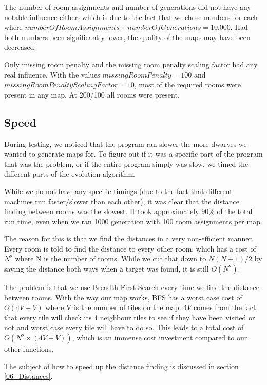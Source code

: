 The number of room assignments and number of generations did not have any notable influence either, which is due to the fact that we chose numbers for each where $numberOfRoomAssignments \times numberOfGenerations = 10.000$. Had both numbers been significantly lower, the quality of the maps may have been decreased.

Only missing room penalty and the missing room penalty scaling factor had any real influence. With the values $missingRoomPenalty = 100$ and $missingRoomPenaltyScalingFactor = 10$, most of the required rooms were present in any map. At 200/100 all rooms were present.

\subsection{Speed}

During testing, we noticed that the program ran slower the more dwarves we wanted to generate maps for. To figure out if it was a specific part of the program that was the problem, or if the entire program simply was slow, we timed the different parts of the evolution algorithm.

While we do not have any specific timings (due to the fact that different machines run faster/slower than each other), it was clear that the distance finding between rooms was the slowest. It took approximately 90\% of the total run time, even when we ran 1000 generation with 100 room assignments per map.

The reason for this is that we find the distances in a very non-efficient manner. Every room is told to find the distance to every other room, which has a cost of $N^2$ where N is the number of rooms. While we cut that down to $N(N+1)/2$ by saving the distance both ways when a target was found, it is still $O(N^2)$.

The problem is that we use Breadth-First Search every time we find the distance between rooms. With the way our map works, BFS has a worst case cost of $O(4V + V)$ where V is the number of tiles on the map. $4V$ comes from the fact that every tile will check its 4 neighbour tiles to see if they have been visited or not and worst case every tile will have to do so. This leads to a total cost of $O(N^2 \times (4V + V))$, which is an immense cost investment compared to our other functions.

The subject of how to speed up the distance finding is discussed in section \ref{06_Distances}.





